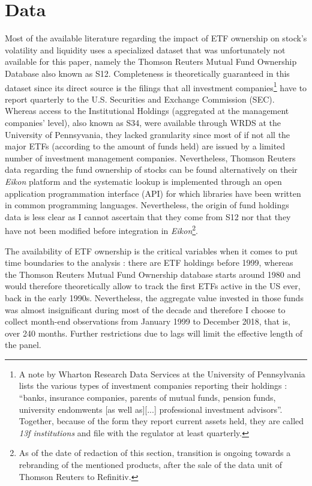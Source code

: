 \section{Data}\label{sec:Data}
Most of the available literature regarding the impact of ETF ownership on stock's volatility and liquidity uses a specialized dataset that was unfortunately not available for this paper, namely the Thomson Reuters Mutual Fund Ownership Database also known as S12. Completeness is theoretically guaranteed in this dataset since its direct source is the filings that all investment companies\footnote{A note by Wharton Research Data Services at the University of Pennsylvania lists the various types of investment companies reporting their holdings : ``banks, insurance companies, parents of mutual funds, pension funds, university endomwents [as well as][...] professional investment advisors''. Together, because of the form they report current assets held, they are called \textit{13f institutions} and file with the regulator at least quarterly.} have to report quarterly to the U.S. Securities and Exchange Commission (SEC). Whereas access to the Institutional Holdings (aggregated at the management companies' level), also known as S34, were available through WRDS at the University of Pennsyvania, they lacked granularity since most of if not all the major ETFs (according to the amount of funds held) are issued by a limited number of investment management companies. Nevertheless, Thomson Reuters data regarding the fund ownership of stocks can be found alternatively on their \textit{Eikon} platform and the systematic lookup is implemented through an open application programmation interface (API) for which libraries have been written in common programming languages. Nevertheless, the origin of fund holdings data is less clear as I cannot ascertain that they come from S12 nor that they have not been modified before integration in \textit{Eikon}\footnote{As of the date of redaction of this section, transition is ongoing towards a rebranding of the mentioned products, after the sale of the data unit of Thomson Reuters to Refinitiv.}.

The availability of ETF ownership is the critical variables when it comes to put time boundaries to the analysis : there are ETF holdings before 1999, whereas the Thomson Reuters Mutual Fund Ownership database starts around 1980 and would therefore theoretically allow to track the first ETFs active in the US ever, back in the early 1990s. Nevertheless, the aggregate value invested in those funds was almost insignificant during most of the decade and therefore I choose to collect month-end observations from January 1999 to December 2018, that is, over 240 months. Further restrictions due to lags will limit the effective length of the panel.  

